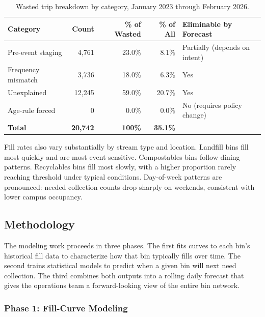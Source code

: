 \documentclass[11pt]{article}
\begin{document}
\begin{table}[ht]
\centering
\caption{Wasted trip breakdown by category, January 2023 through February 2026.}
\label{tab:wasted}
\begin{tabularx}{\textwidth}{L{3.2cm} r r r L{3.8cm}}
\toprule
\textbf{Category} & \textbf{Count} & \textbf{\% of Wasted} & \textbf{\% of All} &
\textbf{Eliminable by Forecast} \\
\midrule
Pre-event staging   & 4,761  & 23.0\% & 8.1\%  & Partially (depends on intent) \\
Frequency mismatch  & 3,736  & 18.0\% & 6.3\%  & Yes \\
Unexplained         & 12,245 & 59.0\% & 20.7\% & Yes \\
Age-rule forced     & 0      & 0.0\%  & 0.0\%  & No (requires policy change) \\
\midrule
\textbf{Total}      & \textbf{20,742} & \textbf{100\%} & \textbf{35.1\%} & \\
\bottomrule
\end{tabularx}
\end{table}

Fill rates also vary substantially by stream type and location. Landfill bins fill most
quickly and are most event-sensitive. Compostables bins follow dining patterns.
Recyclables bins fill most slowly, with a higher proportion rarely reaching threshold
under typical conditions. Day-of-week patterns are pronounced: needed collection counts
drop sharply on weekends, consistent with lower campus occupancy.

\subsection{Methodology}

The modeling work proceeds in three phases. The first fits curves to each bin's historical
fill data to characterize how that bin typically fills over time. The second trains
statistical models to predict when a given bin will next need collection. The third
combines both outputs into a rolling daily forecast that gives the operations team a
forward-looking view of the entire bin network.

\subsubsection*{Phase 1: Fill-Curve Modeling}
\end{document}
